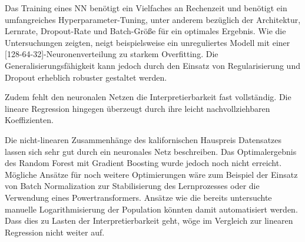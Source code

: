 \documentclass[9pt,a4paper,twocolumn,twoside]{tau-class/tau}
\begin{document}
    
        Das Training eines NN benötigt ein Vielfaches an Rechenzeit und benötigt ein umfangreiches Hyperparameter-Tuning,
        unter anderem bezüglich der Architektur, Lernrate, Dropout-Rate und Batch-Größe für ein optimales Ergebnis.
        Wie die Untersuchungen zeigten, neigt beispielsweise ein unreguliertes Modell mit einer
        [128-64-32]-Neuronenverteilung zu starkem Overfitting.
        Die Generalisierungsfähigkeit kann jedoch durch den Einsatz von Regularisierung und Dropout erheblich robuster
        gestaltet werden.

        Zudem fehlt den neuronalen Netzen die Interpretierbarkeit fast vollständig.
        Die lineare Regression hingegen überzeugt durch ihre leicht nachvollziehbaren Koeffizienten.

        Die nicht-linearen Zusammenhänge des kalifornischen Hauspreis Datensatzes lassen sich sehr gut 
        durch ein neuronales Netz beschreiben. Das Optimalergebnis des Random Forest mit Gradient Boosting wurde jedoch noch nicht erreicht.
        Mögliche Ansätze für noch weitere Optimierungen wäre zum Beispiel der Einsatz von Batch Normalization zur
        Stabilisierung des Lernprozesses oder die Verwendung eines Powertransformers. Ansätze wie die bereits untersuchte manuelle
        Logarithmisierung der Population könnten damit automatisiert werden. Dass dies zu Lasten der Interpretierbarkeit geht,
        wöge im Vergleich zur linearen Regression nicht weiter auf. 

        
        
\end{document}
